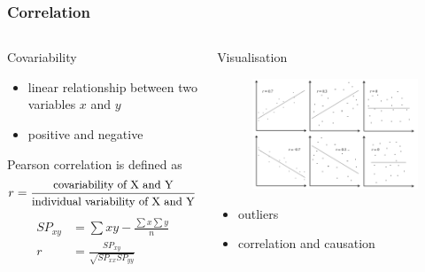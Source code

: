 \documentclass[10pt, compress]{beamer}
\begin{document}
\begin{frame}
    \frametitle{Correlation}
    \begin{columns}
        \begin{block}{Covariability}
            \begin{itemize}
                \item \alert{linear} relationship between two variables $x$ and $y$
                \item positive and negative
            \end{itemize}
            Pearson correlation is defined as
            \begin{equation}
                \small
                r = \frac{\text{covariability of X and Y}}{\text{individual variability of X and Y}}
            \end{equation}
            \begin{align}
                SP_{xy} & = \sum xy - \frac{\sum x \sum y}{n} \\
                r &= \frac{SP_{xy}}{\sqrt{SP_{xx}SP_{yy}}}
            \end{align}
        \end{block}
        \begin{block}{Visualisation}
            \begin{figure}
                \begin{center}
                    \includegraphics[scale=0.2]{img/correlationcoefficient.png}
                \end{center}
            \end{figure}
            \begin{itemize}
                \item \alert{outliers}
                \item \alert{correlation and causation}
            \end{itemize}
        \end{block}
    \end{columns}
\end{frame}
\end{document}
